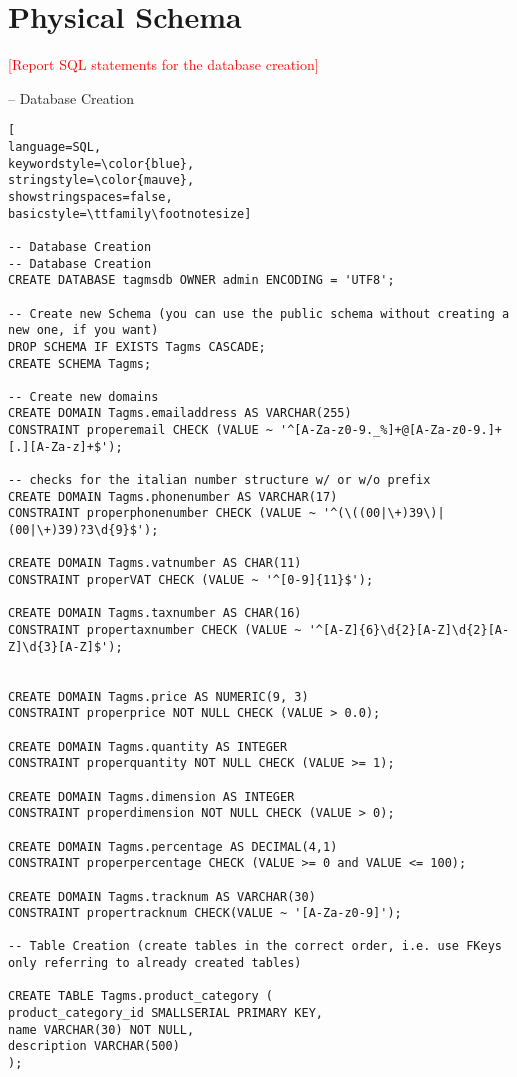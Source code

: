 \section{Physical Schema}
\textcolor{red}{[Report SQL statements for the database creation]}

-- Database Creation
\begin{lstlisting}[
language=SQL,
keywordstyle=\color{blue},
stringstyle=\color{mauve},
showstringspaces=false,
basicstyle=\ttfamily\footnotesize]

-- Database Creation
-- Database Creation
CREATE DATABASE tagmsdb OWNER admin ENCODING = 'UTF8';

-- Create new Schema (you can use the public schema without creating a new one, if you want)
DROP SCHEMA IF EXISTS Tagms CASCADE;
CREATE SCHEMA Tagms;

-- Create new domains
CREATE DOMAIN Tagms.emailaddress AS VARCHAR(255)
CONSTRAINT properemail CHECK (VALUE ~ '^[A-Za-z0-9._%]+@[A-Za-z0-9.]+[.][A-Za-z]+$');

-- checks for the italian number structure w/ or w/o prefix
CREATE DOMAIN Tagms.phonenumber AS VARCHAR(17)
CONSTRAINT properphonenumber CHECK (VALUE ~ '^(\((00|\+)39\)|(00|\+)39)?3\d{9}$');

CREATE DOMAIN Tagms.vatnumber AS CHAR(11)
CONSTRAINT properVAT CHECK (VALUE ~ '^[0-9]{11}$');

CREATE DOMAIN Tagms.taxnumber AS CHAR(16)
CONSTRAINT propertaxnumber CHECK (VALUE ~ '^[A-Z]{6}\d{2}[A-Z]\d{2}[A-Z]\d{3}[A-Z]$');


CREATE DOMAIN Tagms.price AS NUMERIC(9, 3)
CONSTRAINT properprice NOT NULL CHECK (VALUE > 0.0);

CREATE DOMAIN Tagms.quantity AS INTEGER
CONSTRAINT properquantity NOT NULL CHECK (VALUE >= 1);

CREATE DOMAIN Tagms.dimension AS INTEGER
CONSTRAINT properdimension NOT NULL CHECK (VALUE > 0);

CREATE DOMAIN Tagms.percentage AS DECIMAL(4,1)
CONSTRAINT properpercentage CHECK (VALUE >= 0 and VALUE <= 100);

CREATE DOMAIN Tagms.tracknum AS VARCHAR(30)
CONSTRAINT propertracknum CHECK(VALUE ~ '[A-Za-z0-9]');

-- Table Creation (create tables in the correct order, i.e. use FKeys only referring to already created tables)

CREATE TABLE Tagms.product_category (
product_category_id SMALLSERIAL PRIMARY KEY,
name VARCHAR(30) NOT NULL,
description VARCHAR(500)
);


\end{lstlisting}
